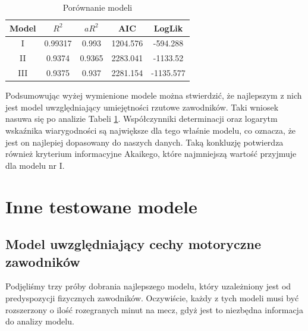\documentclass[11pt,a4paper]{article}
\begin{document}
\begin{table}[H]
	\begin{center}
		\begin{tabular}{| c | c | c | c | c |}
			\hline
			Model & $R^2$ & $aR^2$ & AIC & LogLik \\ \hline
			I & 0.99317 & 0.993 & 1204.576 & -594.288\\ \hline
			II & 0.9374 & 0.9365 & 2283.041 & -1133.52\\ \hline 
			III & 0.9375 & 0.937 & 2281.154 & -1135.577\\ \hline  
		\end{tabular}
		\caption{Porównanie modeli}
		\label{porownanie_modeli}
	\end{center}
\end{table}
Podsumowując wyżej wymienione modele można stwierdzić, że najlepszym z nich jest model uwzględniający umiejętności rzutowe zawodników. Taki wniosek nasuwa się po analizie Tabeli \ref{porownanie_modeli}. Współczynniki determinacji oraz logarytm wskaźnika wiarygodności są największe dla tego właśnie modelu, co oznacza, że jest on najlepiej dopasowany do naszych danych. Taką konkluzję potwierdza również kryterium informacyjne Akaikego, które najmniejszą wartość przyjmuje dla modelu nr I.

\section{Inne testowane modele}
\subsection{Model uwzględniający cechy motoryczne zawodników}
Podjęliśmy trzy próby dobrania najlepszego modelu, który uzależniony jest od predyspozycji fizycznych zawodników. Oczywiście, każdy z tych modeli musi być rozszerzony o ilość rozegranych minut na mecz, gdyż jest to niezbędna informacja do analizy modelu.
\end{document}

